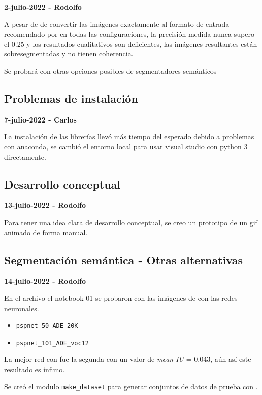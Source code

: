 \textbf{2-julio-2022 - Rodolfo}

A pesar de de convertir las imágenes exactamente al formato de entrada recomendado por \textcite{gupta2022} en todas las configuraciones, la precisión medida nunca supero el 0.25 y los resultados cualitativos son  deficientes, las imágenes resultantes están sobresegmentadas y no tienen coherencia.

Se probará con otras opciones posibles de segmentadores semánticos


\subsection*{Problemas de instalación}

\textbf{7-julio-2022 - Carlos}

La instalación de las librerías llevó más tiempo del esperado debido a problemas con anaconda, se cambió el entorno local para usar visual studio con python 3 directamente.


\subsection*{Desarrollo conceptual}


\textbf{13-julio-2022 - Rodolfo}

Para tener una idea clara de desarrollo conceptual, se creo un prototipo de un gif animado de forma manual.

\subsection*{Segmentación semántica - Otras alternativas}

\textbf{14-julio-2022 - Rodolfo}

En el archivo el notebook 01 se probaron con las imágenes de \textcite{unity2022} con las redes neuronales.

\begin{itemize}
    \item \texttt{pspnet\_50\_ADE\_20K}
    \item \texttt{pspnet\_101\_ADE\_voc12}
\end{itemize}

La mejor red con fue la segunda con un valor de \textit{mean IU} = 0.043, aún así este resultado es ínfimo.


Se creó el modulo  \texttt{make\_dataset} para generar conjuntos de datos de prueba con \textcite{unity2022}.


